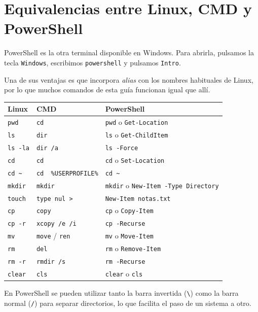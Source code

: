 \documentclass[11pt,a4paper]{article}
\begin{document}






\newpage
\section{Equivalencias entre Linux, CMD y PowerShell}

PowerShell es la otra terminal disponible en Windows. Para abrirla, pulsamos la tecla \texttt{Windows}, escribimos \texttt{powershell} y pulsamos \texttt{Intro}.

Una de sus ventajas es que incorpora \textit{alias} con los nombres habituales de Linux, por lo que muchos comandos de esta guía funcionan igual que allí.

\begin{longtable}{p{}p{}p{}}
\toprule
\textbf{Linux} & \textbf{CMD} & \textbf{PowerShell} \\
\midrule
\endhead

\texttt{pwd} &
\texttt{cd} &
\texttt{pwd} o \texttt{Get-Location} \\

\texttt{ls} &
\texttt{dir} &
\texttt{ls} o \texttt{Get-ChildItem} \\

\texttt{ls -la} &
\texttt{dir /a} &
\texttt{ls -Force} \\

\texttt{cd} &
\texttt{cd} &
\texttt{cd} o \texttt{Set-Location} \\

\texttt{cd \textasciitilde} &
\texttt{cd\,\,\%USERPROFILE\%} &
\texttt{cd \textasciitilde} \\

\texttt{mkdir} &
\texttt{mkdir} &
\texttt{mkdir} o \texttt{New-Item -Type Directory} \\

\texttt{touch} &
\texttt{type nul >} &
\texttt{New-Item notas.txt} \\

\texttt{cp} &
\texttt{copy} &
\texttt{cp} o \texttt{Copy-Item} \\

\texttt{cp -r} &
\texttt{xcopy /e /i} &
\texttt{cp -Recurse} \\

\texttt{mv} &
\texttt{move} / \texttt{ren} &
\texttt{mv} o \texttt{Move-Item} \\

\texttt{rm} &
\texttt{del} &
\texttt{rm} o \texttt{Remove-Item} \\

\texttt{rm -r} &
\texttt{rmdir /s} &
\texttt{rm -Recurse} \\

\texttt{clear} &
\texttt{cls} &
\texttt{clear} o \texttt{cls} \\

\bottomrule
\end{longtable}

\begin{importante}
En PowerShell se pueden utilizar tanto la barra invertida
(\texttt{\textbackslash}) como la barra normal (\texttt{/}) para
separar directorios, lo que facilita el paso de un sistema a otro.
\end{importante}
\end{document}
